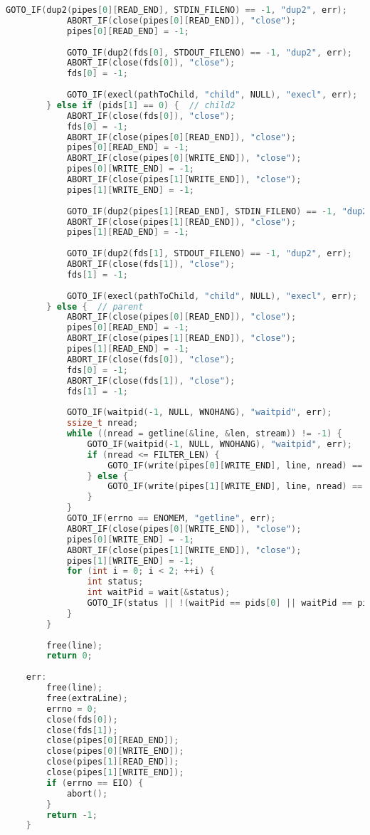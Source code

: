 \documentclass[a4paper, 12pt]{article}
\begin{document}
\begin{lstlisting}[language=C++]
            GOTO_IF(dup2(pipes[0][READ_END], STDIN_FILENO) == -1, "dup2", err);
            ABORT_IF(close(pipes[0][READ_END]), "close");
            pipes[0][READ_END] = -1;
    
            GOTO_IF(dup2(fds[0], STDOUT_FILENO) == -1, "dup2", err);
            ABORT_IF(close(fds[0]), "close");
            fds[0] = -1;
    
            GOTO_IF(execl(pathToChild, "child", NULL), "execl", err);
        } else if (pids[1] == 0) {  // child2
            ABORT_IF(close(fds[0]), "close");
            fds[0] = -1;
            ABORT_IF(close(pipes[0][READ_END]), "close");
            pipes[0][READ_END] = -1;
            ABORT_IF(close(pipes[0][WRITE_END]), "close");
            pipes[0][WRITE_END] = -1;
            ABORT_IF(close(pipes[1][WRITE_END]), "close");
            pipes[1][WRITE_END] = -1;
    
            GOTO_IF(dup2(pipes[1][READ_END], STDIN_FILENO) == -1, "dup2", err);
            ABORT_IF(close(pipes[1][READ_END]), "close");
            pipes[1][READ_END] = -1;
    
            GOTO_IF(dup2(fds[1], STDOUT_FILENO) == -1, "dup2", err);
            ABORT_IF(close(fds[1]), "close");
            fds[1] = -1;
    
            GOTO_IF(execl(pathToChild, "child", NULL), "execl", err);
        } else {  // parent
            ABORT_IF(close(pipes[0][READ_END]), "close");
            pipes[0][READ_END] = -1;
            ABORT_IF(close(pipes[1][READ_END]), "close");
            pipes[1][READ_END] = -1;
            ABORT_IF(close(fds[0]), "close");
            fds[0] = -1;
            ABORT_IF(close(fds[1]), "close");
            fds[1] = -1;
    
            GOTO_IF(waitpid(-1, NULL, WNOHANG), "waitpid", err);
            ssize_t nread;
            while ((nread = getline(&line, &len, stream)) != -1) {
                GOTO_IF(waitpid(-1, NULL, WNOHANG), "waitpid", err);
                if (nread <= FILTER_LEN) {
                    GOTO_IF(write(pipes[0][WRITE_END], line, nread) == -1, "write", err);
                } else {
                    GOTO_IF(write(pipes[1][WRITE_END], line, nread) == -1, "write", err);
                }
            }
            GOTO_IF(errno == ENOMEM, "getline", err);
            ABORT_IF(close(pipes[0][WRITE_END]), "close");
            pipes[0][WRITE_END] = -1;
            ABORT_IF(close(pipes[1][WRITE_END]), "close");
            pipes[1][WRITE_END] = -1;
            for (int i = 0; i < 2; ++i) {
                int status;
                int waitPid = wait(&status);
                GOTO_IF(status || !(waitPid == pids[0] || waitPid == pids[1]), "wait", err);
            }
        }
    
        free(line);
        return 0;
    
    err:
        free(line);
        free(extraLine);
        errno = 0;
        close(fds[0]);
        close(fds[1]);
        close(pipes[0][READ_END]);
        close(pipes[0][WRITE_END]);
        close(pipes[1][READ_END]);
        close(pipes[1][WRITE_END]);
        if (errno == EIO) {
            abort();
        }
        return -1;
    }
\end{lstlisting}
\end{document}
